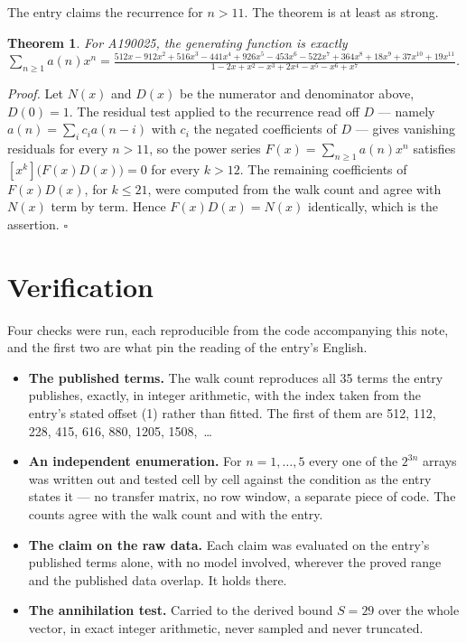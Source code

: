 \documentclass[11pt]{article}
\newtheorem{theorem}{Theorem}
\theoremstyle{definition}
\begin{document}
The entry claims the recurrence for $n > 11$. The theorem is at least as strong.

\begin{theorem} For A190025, the generating function is exactly $\sum_{n\ge 1} a(n)x^n = \frac{512x - 912x^{2} + 516x^{3} - 441x^{4} + 926x^{5} - 453x^{6} - 522x^{7} + 364x^{8} + 18x^{9} + 37x^{10} + 19x^{11}}{1 - 2x + x^{2} - x^{3} + 2x^{4} - x^{5} - x^{6} + x^{7}}$.\end{theorem}

{\itshape Proof.} Let $N(x)$ and $D(x)$ be the numerator and denominator above, $D(0)=1$. The residual test applied to the recurrence read off $D$ --- namely $a(n) = \sum_i c_i a(n-i)$ with $c_i$ the negated coefficients of $D$ --- gives vanishing residuals for every $n > 11$, so the power series $F(x)=\sum_{n\ge 1}a(n)x^n$ satisfies $[x^k]\bigl(F(x)D(x)\bigr) = 0$ for every $k > 12$. The remaining coefficients of $F(x)D(x)$, for $k \le 21$, were computed from the walk count and agree with $N(x)$ term by term. Hence $F(x)D(x) = N(x)$ identically, which is the assertion. $\square$

\section{Verification}

Four checks were run, each reproducible from the code accompanying this note, and the first two are what pin the reading of the entry's English.

\begin{itemize}

\item {\bfseries The published terms.} The walk count reproduces all 35 terms the entry publishes, exactly, in integer arithmetic, with the index taken from the entry's stated offset (1) rather than fitted. The first of them are 512, 112, 228, 415, 616, 880, 1205, 1508,~\dots

\item {\bfseries An independent enumeration.} For $n = 1,\dots,5$ every one of the $2^{3n}$ arrays was written out and tested cell by cell against the condition as the entry states it --- no transfer matrix, no row window, a separate piece of code. The counts agree with the walk count and with the entry.

\item {\bfseries The claim on the raw data.} Each claim was evaluated on the entry's published terms alone, with no model involved, wherever the proved range and the published data overlap. It holds there.

\item {\bfseries The annihilation test.} Carried to the derived bound $S = 29$ over the whole vector, in exact integer arithmetic, never sampled and never truncated.

\end{itemize}
\end{document}
